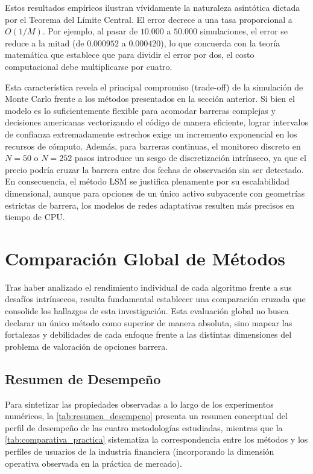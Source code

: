 Estos resultados empíricos ilustran vívidamente la naturaleza asintótica dictada por el Teorema del Límite Central. El error decrece a una tasa proporcional a $O(1/M)$. Por ejemplo, al pasar de $10.000$ a $50.000$ simulaciones, el error se reduce a la mitad (de $0.000952$ a $0.000420$), lo que concuerda con la teoría matemática que establece que para dividir el error por dos, el costo computacional debe multiplicarse por cuatro.

Esta característica revela el principal compromiso (trade-off) de la simulación de Monte Carlo frente a los métodos presentados en la sección anterior. Si bien el modelo es lo suficientemente flexible para acomodar barreras complejas y decisiones americanas vectorizando el código de manera eficiente, lograr intervalos de confianza extremadamente estrechos exige un incremento exponencial en los recursos de cómputo. Además, para barreras continuas, el monitoreo discreto en $N=50$ o $N=252$ pasos introduce un sesgo de discretización intrínseco, ya que el precio podría cruzar la barrera entre dos fechas de observación sin ser detectado. En consecuencia, el método LSM se justifica plenamente por su escalabilidad dimensional, aunque para opciones de un único activo subyacente con geometrías estrictas de barrera, los modelos de redes adaptativas resulten más precisos en tiempo de CPU.

\section{Comparación Global de Métodos}
\label{sec:comparacion_global}

Tras haber analizado el rendimiento individual de cada algoritmo frente a sus desafíos intrínsecos, resulta fundamental establecer una comparación cruzada que consolide los hallazgos de esta investigación. Esta evaluación global no busca declarar un único método como superior de manera absoluta, sino mapear las fortalezas y debilidades de cada enfoque frente a las distintas dimensiones del problema de valoración de opciones barrera.

\subsection{Resumen de Desempeño}

Para sintetizar las propiedades observadas a lo largo de los experimentos numéricos, la \autoref{tab:resumen_desempeno} presenta un resumen conceptual del perfil de desempeño de las cuatro metodologías estudiadas, mientras que la \autoref{tab:comparativa_practica} sistematiza la correspondencia entre los métodos y los perfiles de usuarios de la industria financiera (incorporando la dimensión operativa observada en la práctica de mercado).

